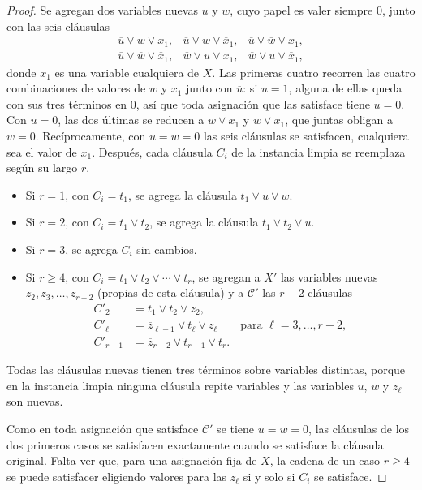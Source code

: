\documentclass[12pt, spanish, oneside, openany]{book}
\newcommand{\nega}[1]{\overline{#1}} %
\theoremstyle{uprightplain}
\theoremstyle{definition}
\theoremstyle{remark}
\theoremstyle{definition}
\begin{document}
\begin{proof}
Se agregan dos variables nuevas $u$ y $w$, cuyo papel es valer siempre $0$, junto con las seis cláusulas
\[
\begin{array}{lll}
\nega{u}\vee w\vee x_1, & \nega{u}\vee w\vee\nega{x}_1, & \nega{u}\vee\nega{w}\vee x_1,\\[2pt]
\nega{u}\vee\nega{w}\vee\nega{x}_1, & \nega{w}\vee u\vee x_1, & \nega{w}\vee u\vee\nega{x}_1,
\end{array}
\]
donde $x_1$ es una variable cualquiera de $X$. Las primeras cuatro recorren las cuatro combinaciones de valores de $w$ y $x_1$ junto con $\nega{u}$: si $u=1$, alguna de ellas queda con sus tres términos en $0$, así que toda asignación que las satisface tiene $u=0$. Con $u=0$, las dos últimas se reducen a $\nega{w}\vee x_1$ y $\nega{w}\vee\nega{x}_1$, que juntas obligan a $w=0$. Recíprocamente, con $u=w=0$ las seis cláusulas se satisfacen, cualquiera sea el valor de $x_1$. Después, cada cláusula $C_i$ de la instancia limpia se reemplaza según su largo $r$.
\begin{itemize}
    \item Si $r=1$, con $C_i=t_1$, se agrega la cláusula $t_1\vee u\vee w$.
    \item Si $r=2$, con $C_i=t_1\vee t_2$, se agrega la cláusula $t_1\vee t_2\vee u$.
    \item Si $r=3$, se agrega $C_i$ sin cambios.
    \item Si $r\ge 4$, con $C_i=t_1\vee t_2\vee\cdots\vee t_r$, se agregan a $X'$ las variables nuevas $z_2,z_3,\dots,z_{r-2}$ (propias de esta cláusula) y a $\mathcal{C}'$ las $r-2$ cláusulas
    \[
    \begin{aligned}
    C'_2&=t_1\vee t_2\vee z_2,\\
    C'_\ell&=\nega{z}_{\ell-1}\vee t_\ell\vee z_\ell\qquad\text{para }\ell=3,\dots,r-2,\\
    C'_{r-1}&=\nega{z}_{r-2}\vee t_{r-1}\vee t_r .
    \end{aligned}
    \]
\end{itemize}
Todas las cláusulas nuevas tienen tres términos sobre variables distintas, porque en la instancia limpia ninguna cláusula repite variables y las variables $u$, $w$ y $z_\ell$ son nuevas.

Como en toda asignación que satisface $\mathcal{C}'$ se tiene $u=w=0$, las cláusulas de los dos primeros casos se satisfacen exactamente cuando se satisface la cláusula original. Falta ver que, para una asignación fija de $X$, la cadena de un caso $r\ge 4$ se puede satisfacer eligiendo valores para las $z_\ell$ si y solo si $C_i$ se satisface.


\end{proof}
\end{document}
